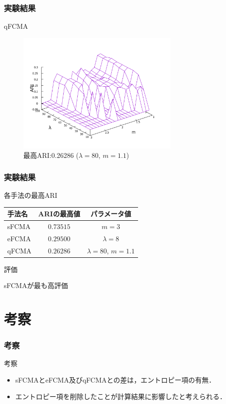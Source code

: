 \documentclass[13pt,dvipdfmx]{beamer}
\begin{document}
\begin{frame}\frametitle{実験結果}
  \begin{block}{qFCMA}
    \begin{figure}[htbp]
      \begin{center}
        \includegraphics[height=60mm]{qFCMA_ARI.pdf}
      \end{center}
      \captionsetup{labelformat=empty,labelsep=none}
      \caption{最高ARI:0.26286 ($\lambda=80$, $m=1.1$)}
    \end{figure}
  \end{block}
\end{frame}

\begin{frame}\frametitle{実験結果}
  \begin{block}{各手法の最高ARI}
    \vspace{5mm}
    \begin{table}
      \begin{tabular}{ l || c | c }\hline
       手法名 & ARIの最高値 & パラメータ値\\ \hline \hline
       sFCMA & $0.73515$ & $m = 3$\\ \hline
       eFCMA & $0.29500$& $\lambda = 8$\\ \hline  
       qFCMA & $0.26286$ & $\lambda = 80$, $m = 1.1$\\  \hline
      \end{tabular}
    \end{table}
  \end{block}
  \begin{block}{評価}
    \begin{center}
      sFCMAが最も高評価
    \end{center}
  \end{block}
\end{frame}

\section{考察}
\begin{frame}\frametitle{考察}
  \begin{block}{考察}
    \begin{itemize}
    \item sFCMAとeFCMA及びqFCMAとの差は，エントロピー項の有無．
    \item エントロピー項を削除したことが計算結果に影響したと考えられる．
    \end{itemize}
  \end{block}
\end{frame}
\end{document}
